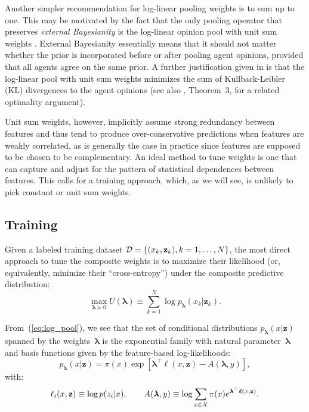 \documentclass[english]{scrartcl}
\def\y{{\mathbf{y}}}
\def\y{{\mathbf{z}}}
\newcommand{\blambda}{{\boldsymbol{\lambda}}}
\newcommand{\bell}{{\boldsymbol{\ell}}}
\begin{document}
Another simpler recommendation for log-linear pooling weights is to sum up to one. This may be motivated by the fact that the only pooling operator that preserves {\em external Bayesianity} is the log-linear opinion pool with unit sum weights \cite{Genest-86b}. External Bayesianity essentially means that it should not matter whether the prior is incorporated before or after pooling agent opinions, provided that all agents agree on the same prior. A further justification given in \cite{Garg-04} is that the log-linear pool with unit sum weights minimizes the sum of Kullback-Leibler (KL) divergences to the agent opinions (see also \cite{Wang-14}, Theorem~3, for a related optimality argument).

Unit sum weights, however, implicitly assume strong redundancy between features and thus tend to produce over-conservative predictions when features are weakly correlated, as is generally the case in practice since features are supposed to be chosen to be complementary. An ideal method to tune weights is one that can capture and adjust for the pattern of statistical dependences between features. This calls for a training approach, which, as we will see, is unlikely to pick constant or unit sum weights.


\subsection{Training}

Given a labeled training dataset ${\cal D}=\{(x_k,\y_k), k=1,\ldots,N\}$, the most direct approach to tune the composite weights is to maximize their likelihood (or, equivalently, minimize their ``cross-entropy'') under the composite predictive distribution:
\begin{equation}
\label{eq:train_likelihood}
\max_{\blambda\succeq 0} U(\blambda)
\equiv\sum_{k=1}^N \log p_\blambda(x_k|\y_k).
\end{equation}

From~(\ref{eq:log_pool}), we see that the set of conditional distributions $p_\blambda(x|\y)$ spanned by the weights~$\blambda$ is the exponential family with natural parameter~$\blambda$ and basis functions given by the feature-based log-likelihoods:
$$
p_\blambda(x|\y) = \pi(x) \exp[\blambda^\top \bell(x,\y) - A(\blambda,y)],
$$
with:
$$
\ell_i(x,\y) \equiv \log p(z_i|x),
\qquad
A(\blambda, y) \equiv \log \sum_{x\in{\cal X}} \pi(x) e^{\blambda^\top \bell(x,\y)}.
$$
\end{document}

